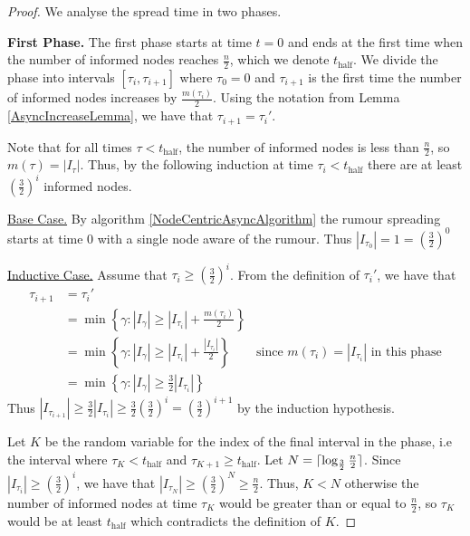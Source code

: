 \documentclass[a4paper,11pt]{article}
\theoremstyle{definition}
\DeclarePairedDelimiter\ceil{\lceil}{\rceil}
\begin{document}
\begin{proof}
	We analyse the spread time in two phases. 


	\textbf{First Phase.} The first phase starts at time $t=0$ and ends at the first time when the number of informed nodes reaches $\frac{n}{2}$, which we denote $t_\text{half}$. We divide the phase into intervals $[\tau_i, \tau_{i+1}]$ where $\tau_0 = 0$ and $\tau_{i+1}$ is the first time the number of informed nodes increases by $\frac{m(\tau_i)}{2}$. 
	Using the notation from Lemma \ref{AsyncIncreaseLemma}, we have that $\tau_{i+1} = \tau_i'$. 
	
	Note that for all times $\tau < t_\text{half}$, the number of informed nodes is less than $\frac{n}{2}$, so $m(\tau) = |I_\tau|$. Thus, by the following induction at time $\tau_i < t_\text{half}$ there are at least $(\frac{3}{2})^i$ informed nodes.

	\underline{Base Case.}
	By algorithm \ref{NodeCentricAsyncAlgorithm} the rumour spreading starts at time 0 with a single node aware of the rumour. Thus $|I_{\tau_0}| = 1 = (\frac{3}{2})^0$

	\underline{Inductive Case.} 
	Assume that $\tau_i \geq (\frac{3}{2})^i$.
	From the definition of $\tau_i'$, we have that 
	\begin{align*}
		\tau_{i+1} &= \tau_i' \\
		&= \min\left\{\gamma : |I_{\gamma}| \geq |I_{\tau_i}| + \frac{m(\tau_i)}{2}\right\} \\
		&= \min\left\{\gamma : |I_{\gamma}| \geq |I_{\tau_i}| + \frac{|I_{\tau_i}|}{2}\right\} & \text{since } m(\tau_i) = |I_{\tau _i}| \text{ in this phase} \\ 
		&= \min\left\{\gamma : |I_{\gamma}| \geq \frac{3}{2}|I_{\tau_i}|\right\} 
	\end{align*}
	Thus $|I_{\tau_{i+1}}| \geq \frac{3}{2}|I_{\tau_i}| \geq \frac{3}{2}(\frac{3}{2})^i = (\frac{3}{2})^{i+1}$ by the induction hypothesis. 
	
	Let $K$ be the random variable for the index of the final interval in the phase, i.e the interval where $\tau_K < t_\text{half}$ and $\tau_{K+1} \geq t_\text{half}$.
	Let $N = \ceil{\log_\frac{3}{2}\frac{n}{2}}$.  Since $|I_{\tau_i}| \geq (\frac{3}{2})^i$, we have that $|I_{\tau_N}| \geq (\frac{3}{2})^N \geq \frac{n}{2}$. Thus, $K < N$ otherwise the number of informed nodes at time $\tau_K$ would be greater than or equal to $\frac{n}{2}$, so $\tau_K$ would be at least $t_\text{half}$ which contradicts the definition of $K$.


\end{proof}
\end{document}
